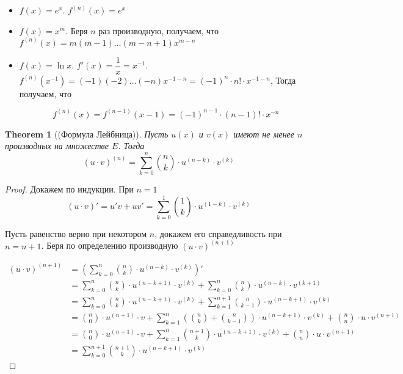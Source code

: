 \documentclass[a4paper]{article}
\theoremstyle{named}
\newtheorem*{namedtheorem}{Theorem}
\begin{document}
\begin{colloq}
\begin{itemize}
			\item
			$f(x) = e^x$. $f^{(n)}(x) = e^x$

			\item
			$f(x) = x^m$. Беря $n$ раз производную, получаем, что $f^{(n)}(x) = m(m - 1) \dots (m - n + 1)x^{m - n}$

			\item
			$f(x) = \ln x$. $f'(x) = \dfrac{1}{x} = x^{-1}$. $f^{(n)}(x^{-1}) = (-1)(-2)\dots(-n)x^{-1-n} = (-1)^n \cdot n! \cdot x^{-1 - n}$, Тогда получаем, что

			\begin{equation*}
				f^{(n)}(x) = f^{(n - 1)}(x - 1) = (-1)^{n - 1} \cdot (n - 1)! \cdot x^{-n}
			\end{equation*}
		\end{itemize}

		\begin{namedtheorem}[(Формула Лейбница)]
			Пусть $u(x)$ и $v(x)$ имеют не менее $n$ производных на множестве $E$. Тогда
			\begin{equation*}
				(u \cdot v)^{(n)} = \sum_{k = 0}^n \binom{n}{k} \cdot u^{(n - k)} \cdot v^{(k)}
			\end{equation*}
		\end{namedtheorem}

		\begin{proof}
			Докажем по индукции. При $n = 1$
			\begin{equation*}
				(u \cdot v)' = u'v + uv' = \sum_{k = 0}^1 \binom{1}{k} \cdot u^{(1 - k)} \cdot v^{(k)}
			\end{equation*}

			Пусть равенство верно при некотором $n$, докажем его справедливость при $n = n + 1$. Беря по определению производную $(u \cdot v)^{(n + 1)}$

			\begin{align*}
				(u \cdot v)^{(n + 1)} 
				&= \left(\sum_{k = 0}^n \binom{n}{k} \cdot u^{(n - k)} \cdot v^{(k)}\right)' \\
				&= \sum_{k = 0}^n \binom{n}{k} \cdot u^{(n - k + 1)} \cdot v^{(k)} + \sum_{k = 0}^n \binom{n}{k} \cdot u^{(n - k)} \cdot v^{(k + 1)} \\
				&= \sum_{k = 0}^n \binom{n}{k} \cdot u^{(n - k + 1)} \cdot v^{(k)} + \sum_{k = 1}^{n + 1} \binom{n}{k - 1} \cdot u^{(n - k + 1)} \cdot v^{(k)} \\
				&= \binom{n}{0} \cdot u^{(n + 1)} \cdot v + \sum_{k = 1}^n \left(\binom{n}{k} + \binom{n}{k - 1}\right) \cdot u^{(n - k + 1)} \cdot v^{(k)} + \binom{n}{n} \cdot u \cdot v^{(n + 1)} \\
				&= \binom{n}{0} \cdot u^{(n + 1)} \cdot v + \sum_{k = 1}^n \binom{n + 1}{k} \cdot u^{(n - k + 1)} \cdot v^{(k)} + \binom{n}{n} \cdot u \cdot v^{(n + 1)} \\
				&= \sum_{k = 0}^{n + 1} \binom{n + 1}{k} \cdot u^{(n - k + 1)} \cdot v^{(k)}
			\end{align*}


\end{proof}
\end{colloq}
\end{document}
